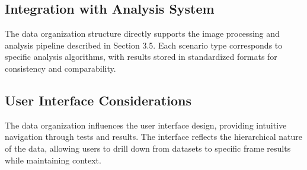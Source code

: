 \subsection{Integration with Analysis System}
The data organization structure directly supports the image processing and analysis pipeline described in Section 3.5. Each scenario type corresponds to specific analysis algorithms, with results stored in standardized formats for consistency and comparability.

\subsection{User Interface Considerations}
The data organization influences the user interface design, providing intuitive navigation through tests and results. The interface reflects the hierarchical nature of the data, allowing users to drill down from datasets to specific frame results while maintaining context.